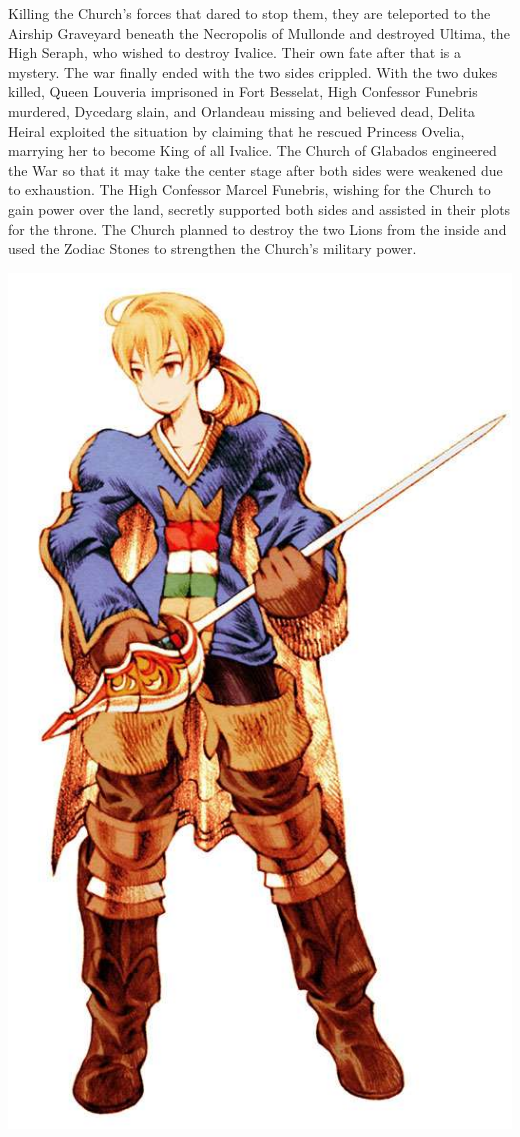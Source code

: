 Killing the Church's forces that dared to stop them, they are teleported to the Airship Graveyard beneath the Necropolis of Mullonde and destroyed Ultima, the High Seraph, who wished to destroy Ivalice. 
Their own fate after that is a mystery.
The war finally ended with the two sides crippled. 
With the two dukes killed, Queen Louveria imprisoned in Fort Besselat, High Confessor Funebris murdered, Dycedarg slain, and Orlandeau missing and believed dead, Delita Heiral exploited the situation by claiming that he rescued Princess Ovelia, marrying her to become King of all Ivalice.
The Church of Glabados engineered the War so that it may take the center stage after both sides were weakened due to exhaustion. 
The High Confessor Marcel Funebris, wishing for the Church to gain power over the land, secretly supported both sides and assisted in their plots for the throne. 
The Church planned to destroy the two Lions from the inside and used the Zodiac Stones to strengthen the Church's military power.
%
\begin{center}\includegraphics[width=0.85\columnwidth]{./art/worldbook/ramza.jpg}\end{center}
